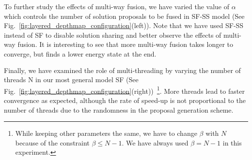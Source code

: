 %
To further study the effects of multi-way fusion, we have varied the
value of $\alpha$ which controls the number of solution proposals to be
fused in SF-SS model (See
Fig.~\ref{fig:layered_depthmap_configuration}(left)). Note that we have used SF-SS
instead of SF to disable solution sharing and better observe the effects
of multi-way fusion.
It is interesting to see that more multi-way fusion takes longer to
converge, but finds a lower energy state at the end.

Finally, we have examined the role of multi-threading by varying the
number of threads N in our most general model SF (See
Fig.~\ref{fig:layered_depthmap_configuration}(right))~\footnote{While keeping other
parameters the same, we have to change $\beta$ with $N$ because of the
constraint $\beta \leq N-1$. We have always used $\beta = N-1$ in this
experiment.}. More threads lead to faster convergence as expected,
although the rate of speed-up is not proportional to the number of
threads due to the randomness in the proposal generation scheme.
